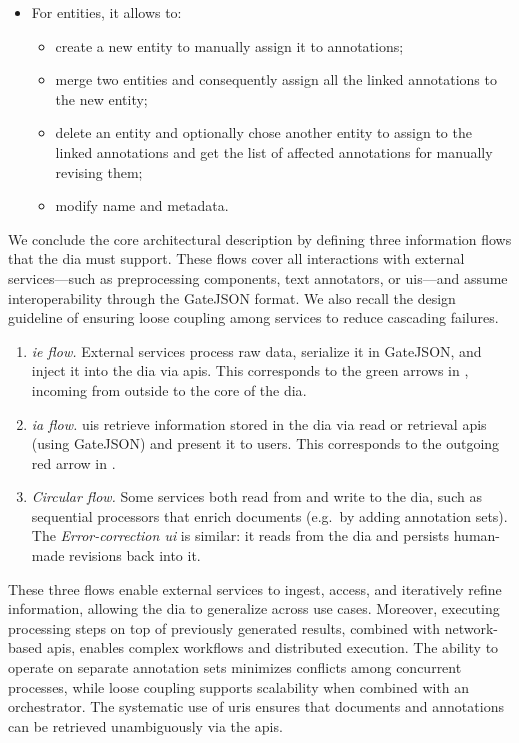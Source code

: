 \begin{itemize}
\begin{itemize}
    \item rollback to a specific version, undoing all the modifications performed afterwards.
  \end{itemize}
  \item For entities, it allows to:
  \begin{itemize}
    \item create a new entity to manually assign it to annotations;
    \item merge two entities and consequently assign all the linked annotations to the new entity;
    \item delete an entity and optionally chose another entity to assign to the linked annotations and get the list of affected annotations for manually revising them;
    \item modify name and metadata.
  \end{itemize}
\end{itemize}

We conclude the core architectural description by defining three information flows that the \ac{dia} must support. These flows cover all interactions with external services---such as preprocessing components, text annotators, or \acp{ui}---and assume interoperability through the GateJSON format. We also recall the design guideline of ensuring loose coupling among services to reduce cascading failures.

\begin{enumerate}
\item \emph{\Acl{ie} flow.}
External services process raw data, serialize it in GateJSON, and inject it into the \ac{dia} via \acp{api}. This corresponds to the green arrows in , incoming from outside to the core of the \ac{dia}.

\item \emph{\Acl{ia} flow.}
\acp{ui} retrieve information stored in the \ac{dia} via read or retrieval \acp{api} (using GateJSON) and present it to users. This corresponds to the outgoing red arrow in .

\item \emph{Circular flow.}
Some services both read from and write to the \ac{dia}, such as sequential processors that enrich documents (e.g.\ by adding annotation sets). The \emph{Error-correction \ac{ui}} is similar: it reads from the \ac{dia} and persists human-made revisions back into it.
\end{enumerate}

These three flows enable external services to ingest, access, and iteratively refine information, allowing the \ac{dia} to generalize across use cases.
Moreover, executing processing steps on top of previously generated results, combined with network-based \acp{api}, enables complex workflows and distributed execution.
The ability to operate on separate annotation sets minimizes conflicts among concurrent processes, while loose coupling supports scalability when combined with an orchestrator. The systematic use of \acp{uri} ensures that documents and annotations can be retrieved unambiguously via the \acp{api}.



